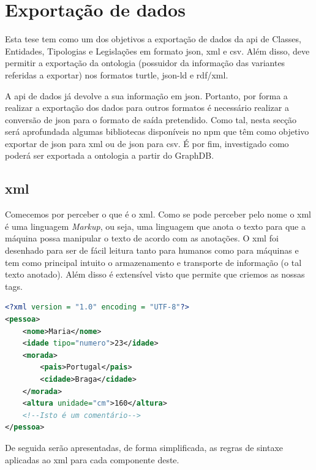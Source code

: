 \section{Exportação de dados}

Esta tese tem como um dos objetivos a exportação de dados da \acrshort{api} de Classes, Entidades, Tipologias e Legislações em formato \acrshort{json}, \acrshort{xml} e \acrshort{csv}. Além disso, deve permitir a exportação da ontologia (possuidor da informação das variantes referidas a exportar) nos formatos \acrshort{turtle}, \acrshort{json-ld} e \acrshort{rdf}/\acrshort{xml}.

A \acrshort{api} de dados já devolve a sua informação em \acrshort{json}. Portanto, por forma a realizar a exportação dos dados para outros formatos é necessário realizar a conversão de \acrshort{json} para o formato de saída pretendido. Como tal, nesta secção será aprofundada algumas bibliotecas disponíveis no \acrshort{npm} que têm como objetivo exportar de \acrshort{json} para \acrshort{xml} ou de \acrshort{json} para \acrshort{csv}. É por fim, investigado como poderá ser exportada a ontologia a partir do GraphDB.

\subsection{\acrshort{xml}}

Comecemos por perceber o que é o \acrfull{xml}. Como se pode perceber pelo nome o \acrshort{xml} é uma linguagem \textit{Markup}, ou seja, uma linguagem que anota o texto para que a máquina possa manipular o texto de acordo com as anotações. O \acrshort{xml} foi desenhado para ser de fácil leitura tanto para humanos como para máquinas e tem como principal intuito o armazenamento e transporte de informação (o tal texto anotado). Além disso é extensível visto que permite que criemos as nossas tags.

\begin{lstlisting}[language=xml, caption=Pequeno exemplo em \acrshort{xml}, label=exem:xmlEx]
<?xml version = "1.0" encoding = "UTF-8"?>
<pessoa>
    <nome>Maria</nome>
    <idade tipo="numero">23</idade>
    <morada>
        <pais>Portugal</pais>
        <cidade>Braga</cidade>
    </morada>
    <altura unidade="cm">160</altura>
    <!--Isto é um comentário-->
</pessoa>
\end{lstlisting}

De seguida serão apresentadas, de forma simplificada, as regras de sintaxe aplicadas ao \acrshort{xml} para cada componente deste.

